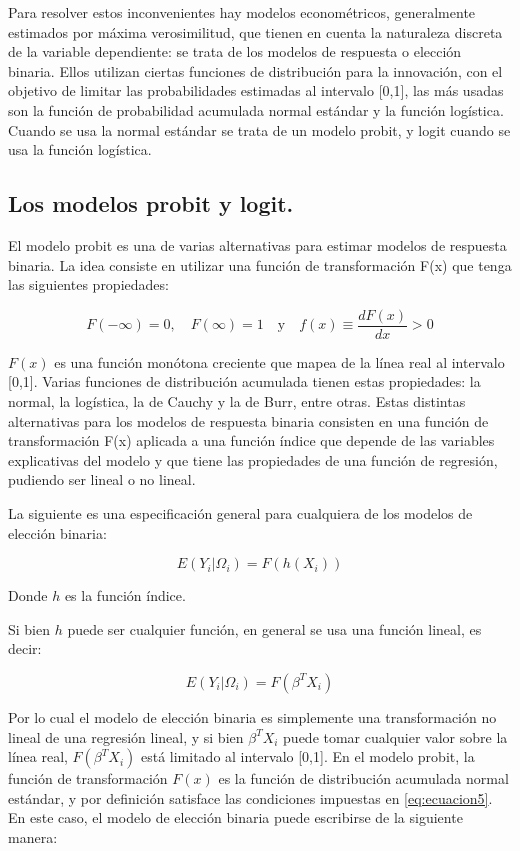 \documentclass[
  12pt,
]{krantz}
\theoremstyle{definition}
\theoremstyle{definition}
\theoremstyle{definition}
\theoremstyle{remark}
\begin{document}
Para resolver estos inconvenientes hay modelos econométricos, generalmente estimados por máxima verosimilitud, que tienen en cuenta la naturaleza discreta de la variable dependiente: se trata de los modelos de respuesta o elección binaria. Ellos utilizan ciertas funciones de distribución para la innovación, con el objetivo de limitar las probabilidades estimadas al intervalo {[}0,1{]}, las más usadas son la función de probabilidad acumulada normal estándar y la función logística. Cuando se usa la normal estándar se trata de un modelo probit, y logit cuando se usa la función logística.

\hypertarget{los-modelos-probit-y-logit.}{%
\subsection{Los modelos probit y logit.}\label{los-modelos-probit-y-logit.}}

El modelo probit es una de varias alternativas para estimar modelos de respuesta binaria. La idea consiste en utilizar una función de transformación F(x) que tenga las siguientes propiedades:

\[F(-\infty)=0, \quad F(\infty)=1\quad\textrm{y}\quad f(x)\equiv\frac{dF(x)}{dx}>0
\label{eq:ecuacion5}\]

\(F(x)\) es una función monótona creciente que mapea de la línea real al intervalo {[}0,1{]}. Varias funciones de distribución acumulada tienen estas propiedades: la normal, la logística, la de Cauchy y la de Burr, entre otras. Estas distintas alternativas para los modelos de respuesta binaria consisten en una función de transformación F(x) aplicada a una función índice que depende de las variables explicativas del modelo y que tiene las propiedades de una función de regresión, pudiendo ser lineal o no lineal.

La siguiente es una especificación general para cualquiera de los modelos de elección binaria:

\[E(Y_i|\Omega_i)=F(h(X_i))
\label{eq:ecuacion6}\]

Donde \(h\) es la función índice.

Si bien \(h\) puede ser cualquier función, en general se usa una función lineal, es decir:

\[E(Y_i|\Omega_i)=F(\beta^TX_i)
\label{eq:ecuacion7}\]

Por lo cual el modelo de elección binaria es simplemente una transformación no lineal de una regresión lineal, y si bien \(\beta^TX_i\) puede tomar cualquier valor sobre la línea real, \(F(\beta^TX_i)\) está limitado al intervalo {[}0,1{]}. En el modelo probit, la función de transformación \(F(x)\) es la función de distribución acumulada normal estándar, y por definición satisface las condiciones impuestas en \eqref{eq:ecuacion5}. En este caso, el modelo de elección binaria puede escribirse de la siguiente manera:
\end{document}
